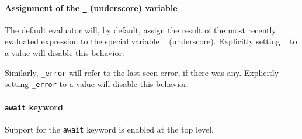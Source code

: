 \paragraph{\texorpdfstring{Assignment of the \texttt{\_} (underscore)
variable}{Assignment of the \_ (underscore) variable}}\label{assignment-of-the-_-underscore-variable}

The default evaluator will, by default, assign the result of the most
recently evaluated expression to the special variable \texttt{\_}
(underscore). Explicitly setting \texttt{\_} to a value will disable
this behavior.

\begin{Shaded}
\begin{Highlighting}[]
\NormalTok{\textgreater{} \_}
\end{Highlighting}
\end{Shaded}

Similarly, \texttt{\_error} will refer to the last seen error, if there
was any. Explicitly setting \texttt{\_error} to a value will disable
this behavior.

\begin{Shaded}
\begin{Highlighting}[]
\end{Highlighting}
\end{Shaded}

\paragraph{\texorpdfstring{\texttt{await}
keyword}{await keyword}}\label{await-keyword}

Support for the \texttt{await} keyword is enabled at the top level.

\begin{Shaded}
\begin{Highlighting}[]
\end{Highlighting}
\end{Shaded}

